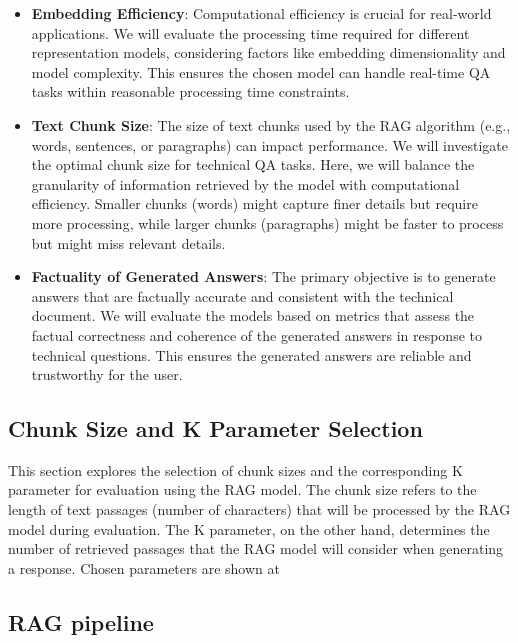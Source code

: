 \begin{itemize}
  \item \textbf{Embedding Efficiency}:
    Computational efficiency is crucial for real-world applications.
    We will evaluate the processing time required for different representation models, considering factors like embedding dimensionality and model complexity.
    This ensures the chosen model can handle real-time \ac{QA} tasks within reasonable processing time constraints.
  \item \textbf{Text Chunk Size}:
    The size of text chunks used by the \ac{RAG} algorithm (e.g., words, sentences, or paragraphs) can impact performance.
    We will investigate the optimal chunk size for technical \ac{QA} tasks.
    Here, we will balance the granularity of information retrieved by the model with computational efficiency.
    Smaller chunks (words) might capture finer details but require more processing, while larger chunks (paragraphs) might be faster to process but might miss relevant details.  
  \item \textbf{Factuality of Generated Answers}:
    The primary objective is to generate answers that are factually accurate and consistent with the technical document.
    We will evaluate the models based on metrics that assess the factual correctness and coherence of the generated answers in response to technical questions.
    This ensures the generated answers are reliable and trustworthy for the user.
\end{itemize}

\subsection{Chunk Size and K Parameter Selection}
This section explores the selection of chunk sizes and the corresponding K parameter for evaluation using the \ac{RAG} model.
The chunk size refers to the length of text passages (number of characters) that will be processed by the \ac{RAG} model during evaluation.
The K parameter, on the other hand, determines the number of retrieved passages that the \ac{RAG} model will consider when generating a response.
Chosen parameters are shown at 



\subsection{\ac{RAG} pipeline}

